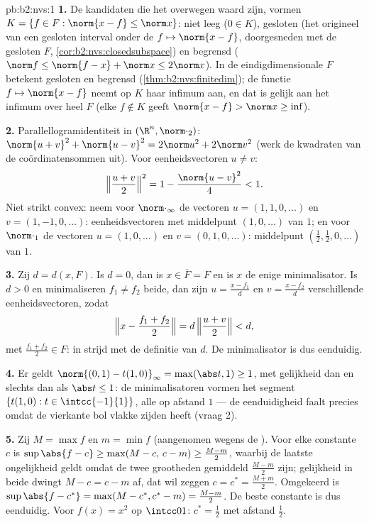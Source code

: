 \begin{solution}{pb:b2:nvs:1}
\textbf{1.} De kandidaten die het overwegen waard zijn, vormen $K
= \{f \in F : \norm{x - f} \leq \norm x\}$: niet leeg ($0 \in K$),
gesloten (het origineel van een gesloten interval onder de 
$f \mapsto \norm{x - f}$, doorgesneden met de gesloten $F$,
\cref{cor:b2:nvs:closedsubspace}) en begrensd ($\norm f \leq
\norm{f - x} + \norm x \leq 2\norm x$). In de
eindigdimensionale $F$ betekent gesloten en begrensd 
(\cref{thm:b2:nvs:finitedim}); de  functie $f \mapsto
\norm{x - f}$ neemt op $K$ haar infimum aan, en dat is gelijk aan
het infimum over heel $F$ (elke $f \notin K$ geeft $\norm{x - f} >
\norm x \geq \inf$).

\textbf{2.} Parallellogramidentiteit in $(\R^n, \norm\cdot_2)$:
$\norm{u + v}^2 + \norm{u - v}^2 = 2\norm u^2 + 2\norm v^2$ (werk
de kwadraten van de coördinatensommen uit). Voor eenheidsvectoren
$u \neq v$:
\[
\Bigl\Vert\frac{u+v}2\Bigr\Vert^2 = 1 - \frac{\norm{u -
v}^2}{4} < 1 .
\]
Niet strikt convex: neem voor $\norm\cdot_\infty$ de vectoren $u =
(1, 1, 0, \dots)$ en $v = (1, -1, 0, \dots)$: eenheidsvectoren met
middelpunt $(1, 0, \dots)$ van  $1$; en voor $\norm\cdot_1$ de
vectoren $u = (1, 0, \dots)$ en $v = (0, 1, 0, \dots)$: middelpunt
$(\frac12, \frac12, 0, \dots)$ van  $1$.

\textbf{3.} Zij $d = d(x, F)$. Is $d = 0$, dan is $x \in \overline
F = F$ en is $x$ de enige minimalisator. Is $d > 0$ en
minimaliseren $f_1 \neq f_2$ beide, dan zijn $u = \frac{x -
f_1}{d}$ en $v = \frac{x - f_2}{d}$ verschillende
eenheidsvectoren, zodat
\[
\Bigl\Vert x - \frac{f_1 + f_2}2\Bigr\Vert
= d\,\Bigl\Vert\frac{u + v}2\Bigr\Vert < d ,
\]
met $\frac{f_1 + f_2}2 \in F$: in strijd met de definitie van $d$.
De minimalisator is dus eenduidig.

\textbf{4.} Er geldt $\norm{(0,1) - t(1,0)}_\infty = \max(\abs t,
1) \geq 1$, met gelijkheid dan en slechts dan als $\abs t \leq 1$:
de minimalisatoren vormen het segment $\{t(1, 0) : t \in
\intcc{-1}{1}\}$, alle op afstand $1$ --- de eenduidigheid faalt
precies omdat de vierkante bol vlakke zijden heeft (vraag 2).

\textbf{5.} Zij $M = \max f$ en $m = \min f$ (aangenomen wegens de
). Voor elke constante $c$ is $\sup\abs{f - c} \geq
\max(M - c,\, c - m) \geq \frac{M - m}2$, waarbij de laatste
ongelijkheid geldt omdat de twee grootheden gemiddeld $\frac{M-m}2$
zijn; gelijkheid in beide dwingt $M - c = c - m$ af, dat wil zeggen
$c = c^* = \frac{M + m}2$. Omgekeerd is $\sup\abs{f - c^*} =
\max(M - c^*, c^* - m) = \frac{M - m}2$. De beste constante is dus
eenduidig. Voor $f(x) = x^2$ op $\intcc01$: $c^* = \frac12$ met
afstand $\frac12$.


\end{solution}
